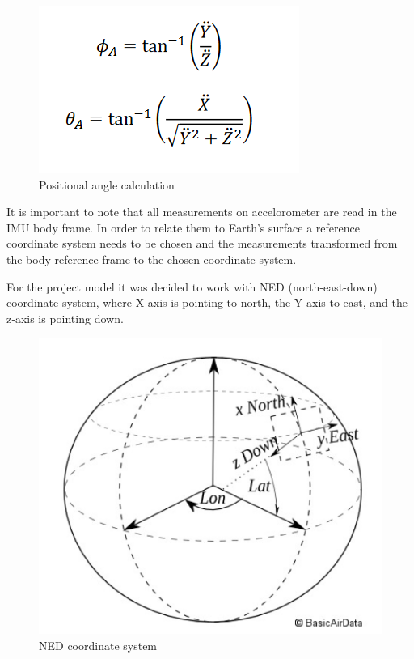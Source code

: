 \begin{figure}[H]
    \begin{center}
    \includegraphics[scale = 0.7]{pictures/IMU/Accel_angles.png}
    \end{center}
    \caption{Positional angle calculation   }
    \label{fig:acc_calc}
\end{figure}

It is important to note that all measurements on accelorometer are read in the IMU body frame. In order to relate them to Earth's surface a reference coordinate system needs to be chosen and the measurements transformed from the body reference frame to the chosen coordinate system.

For the project model it was decided to work with NED (north-east-down) coordinate system, where X axis is pointing to north, the Y‐axis to east, and the z‐axis is pointing down.

\begin{figure}[H]
    \begin{center}
    \includegraphics[scale = 0.5]{pictures/IMU/NED_sys.png}
    \end{center}
    \caption{NED coordinate system \cite{Coordinate_sys}}
    \label{fig:my_label}
\end{figure}

